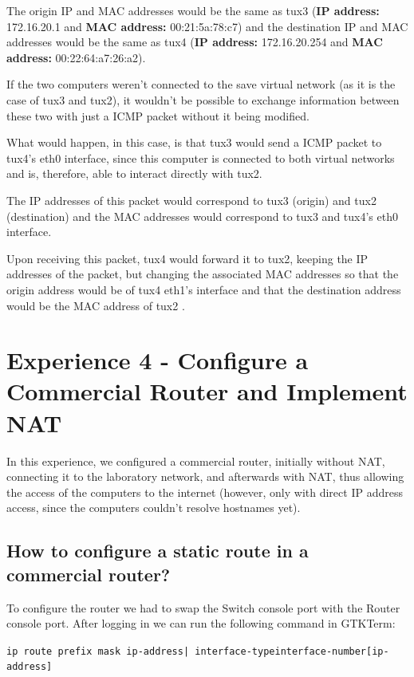 \documentclass[11pt]{report}
\begin{document}
The origin IP and MAC addresses would be the same as tux3 (\textbf{IP address:} 172.16.20.1 and \textbf{MAC address:} 00:21:5a:78:c7) and the destination IP and MAC addresses would be the same as tux4 (\textbf{IP address:} 172.16.20.254 and \textbf{MAC address:} 00:22:64:a7:26:a2).

If the two computers weren't connected to the save virtual network (as it is the case of tux3 and tux2), it wouldn't be possible to exchange information between these two with just a ICMP packet without it being modified.

What would happen, in this case, is that tux3 would send a ICMP packet to tux4's eth0 interface, since this computer is connected to both virtual networks and is, therefore, able to interact directly with tux2. 

The IP addresses of this packet would correspond to tux3 (origin) and tux2 (destination) and the MAC addresses would correspond to tux3 and tux4's eth0 interface.

Upon receiving this packet, tux4 would forward it to tux2, keeping the IP addresses of the packet, but changing the associated MAC addresses so that the origin address would be of tux4 eth1's interface and that the destination address would be the MAC address of tux2 .

\newpage

\section{Experience 4 - Configure a Commercial Router and Implement NAT}

In this experience, we configured a commercial router, initially without NAT, connecting it to the laboratory network, and afterwards with NAT, thus allowing the access of the computers to the internet (however, only with direct IP address access, since the computers couldn't resolve hostnames yet).

\subsection{How to configure a static route in a commercial router?}

To configure the router we had to swap the Switch console port with the Router console port. After logging in we can run the following command in GTKTerm: 

\texttt{ip route prefix mask {ip-address| interface-typeinterface-number[ip-address]} }
\end{document}
